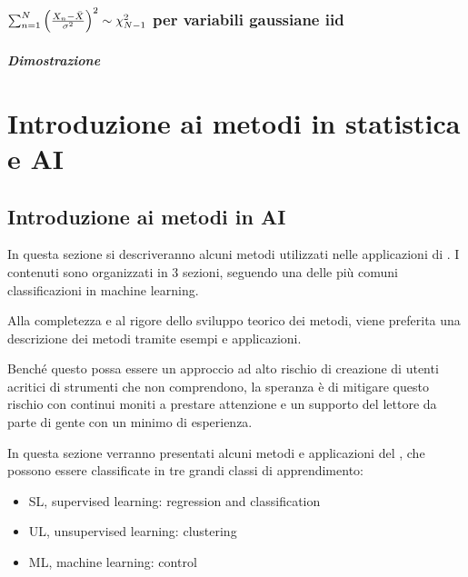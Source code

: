 \documentclass[letterpaper,10pt,italian]{jupyterBook}
\begin{document}
\section{\protect\(\sum_{n=1}^N \left(\frac{X_n - \bar{X}}{\sigma^2}\right)^2 \sim \chi^2_{N-1}\protect\) per variabili gaussiane iid}
\label{\detokenize{ch/proofs:sum-n-1-n-left-frac-x-n-bar-x-sigma-2-right-2-sim-chi-2-n-1-per-variabili-gaussiane-iid}}\label{\detokenize{ch/proofs:proof-s2-chi2-gauss}}\subsubsection*{Dimostrazione}

\sphinxAtStartPar
{}

\sphinxstepscope


\part{Introduzione ai metodi in statistica e  AI}

\sphinxstepscope


\chapter{Introduzione ai metodi in AI}
\label{\detokenize{ch/ai:introduzione-ai-metodi-in-ai}}\label{\detokenize{ch/ai:book-ai-hs}}\label{\detokenize{ch/ai::doc}}
\sphinxAtStartPar
In questa sezione si descriveranno alcuni metodi utilizzati nelle applicazioni di . I contenuti sono organizzati in 3 sezioni, seguendo una delle più comuni classificazioni in machine learning.

\sphinxAtStartPar
{} Alla completezza e al rigore dello sviluppo teorico dei metodi, viene preferita una descrizione dei metodi tramite esempi e applicazioni.

\sphinxAtStartPar
Benché questo possa essere un approccio ad alto rischio di creazione di utenti acritici di strumenti che non comprendono, la speranza è di mitigare questo rischio con continui moniti a prestare attenzione e un supporto del lettore da parte di gente con un minimo di esperienza.

\sphinxAtStartPar
{} In questa sezione verranno presentati alcuni metodi e applicazioni del , che possono essere classificate in tre grandi classi di apprendimento:
\begin{itemize}
\item {} 
\sphinxAtStartPar
SL, supervised learning: regression and classification

\item {} 
\sphinxAtStartPar
UL, unsupervised learning: clustering

\item {} 
\sphinxAtStartPar
ML, machine learning: control

\end{itemize}
\end{document}
